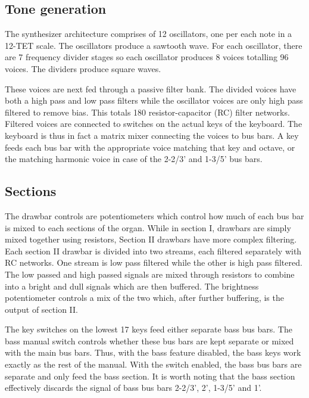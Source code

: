 \documentclass[11pt,a4paper]{article}
\begin{document}
\subsection{Tone generation}

The synthesizer architecture comprises of 12 oscillators, one per each note in a 12-TET scale. The oscillators produce a sawtooth wave. For each oscillator, there are 7 frequency divider stages so each oscillator produces 8 voices totalling 96 voices. The dividers produce square waves. 

These voices are next fed through a passive filter bank. The divided voices have both a high pass and low pass filters while the oscillator voices are only high pass filtered to remove bias. This totals 180 resistor-capacitor (RC) filter networks. Filtered voices are connected to switches on the actual keys of the keyboard. The keyboard is thus in fact a matrix mixer connecting the voices to bus bars. A key feeds each bus bar with the appropriate voice matching that key and octave, or the matching harmonic voice in case of the 2-2/3' and 1-3/5' bus bars. 

\subsection{Sections}
\label{section:sections}

The drawbar controls are potentiometers which control how much of each bus bar is mixed to each sections of the organ. While in section I, drawbars are simply mixed together using resistors, Section II drawbars have more complex filtering. Each section II drawbar is divided into two streams, each filtered separately with RC networks. One stream is low pass filtered while the other is high pass filtered. The low passed and high passed signals are mixed through resistors to combine into a bright and dull signals which are then buffered. The brightness potentiometer controls a mix of the two which, after further buffering, is the output of section II. 

The key switches on the lowest 17 keys feed either separate bass bus bars. The bass manual switch controls whether these bus bars are kept separate or mixed with the main bus bars. Thus, with the bass feature disabled, the bass keys work exactly as the rest of the manual. With the switch enabled, the bass bus bars are separate and only feed the bass section. It is worth noting that the bass section effectively discards the signal of bass bus bars 2-2/3', 2', 1-3/5' and 1'.
\end{document}
